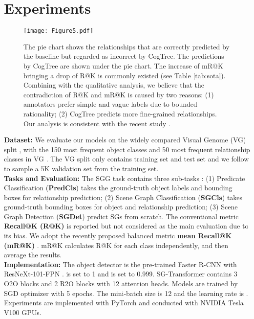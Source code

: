 \documentclass{article}
\begin{document}
\section{Experiments}
\label{sec:experiments}




\iffalse
\begin{figure}[th]
    \centering
    \texttt{[image: figure/induced-tree.png]}
    \caption{Cognition tree structure.}
    \label{fig:trees}
\end{figure}
\fi

\begin{figure}[t]
    \centering
    \texttt{[image: Figure5.pdf]}
    \caption{The pie chart shows the relationships that are correctly predicted by the baseline but regarded as incorrect by CogTree. The predictions by CogTree are shown under the pie chart. The increase of mR@K bringing a drop of R@K is commonly existed (see Table \ref{tab:sota}). Combining with the qualitative analysis, we believe that the contradiction of R@K and mR@K is caused by two reasons: (1) annotators prefer simple and vague  labels due to bounded rationality\protect\cite{simon1990bounded}; (2) CogTree predicts more fine-grained  relationships. Our analysis is consistent with the recent study \protect\cite{Tang2020Unbiased}.} 
    \label{fig:tsne}
\end{figure}

\textbf{Dataset:} We evaluate our models on 
the widely compared Visual Genome (VG) split \cite{xu2017scene},
with the 150 most frequent object classes and 50 most frequent relationship classes in VG \cite{krishna2017visual}. The VG split only contains training set and test set and we follow \cite{zellers2018neural} to sample a 5K validation set from the training set.
\\
\textbf{Tasks and Evaluation:} The SGG task contains three sub-tasks \cite{zellers2018neural}: (1) Predicate Classification (\textbf{PredCls}) takes the ground-truth object labels and bounding boxes for relationship prediction; (2) Scene Graph Classification (\textbf{SGCls}) takes ground-truth bounding boxes for object and relationship prediction; (3) Scene Graph Detection (\textbf{SGDet}) predict SGs from scratch. 
The conventional metric \textbf{Recall@K (R@K)} is reported but not considered as the main evaluation due to its bias. 
We adopt the recently proposed balanced metric \textbf{mean Recall@K  (mR@K)} \cite{chen2019knowledge,tang2019learning}. mR@K calculates R@K for each class independently, and then average the results.  
\\
\textbf{Implementation:} The object detector is the pre-trained Faster R-CNN \cite{ren2015faster} with ResNeXt-101-FPN \cite{Lin2017Feature}.  is set to 1 and  is set to 0.999. SG-Transformer contains 3 O2O blocks and 2 R2O blocks with 12 attention heads. Models are trained by SGD optimizer with 5 epochs. The mini-batch size is 12 and the learning rate is .  Experiments are implemented with PyTorch and conducted with NVIDIA Tesla V100 GPUs.   
\end{document}

